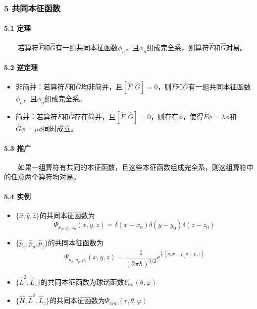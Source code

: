 \documentclass[UTF8,twocolumn]{ctexart}
\providecommand{\tightlist}{%
  \setlength{\itemsep}{0pt}\setlength{\parskip}{0pt}}
\let\oldparagraph\paragraph
\renewcommand{\paragraph}[1]{\oldparagraph{#1}\mbox{}}
\begin{document}
\hypertarget{ux5171ux540cux672cux5f81ux51fdux6570}{%
\subsubsection{5
共同本征函数}\label{ux5171ux540cux672cux5f81ux51fdux6570}}

\hypertarget{ux5b9aux7406}{%
\paragraph{ 5.1 定理}\label{ux5b9aux7406}}

  若算符\(\hat{F}\)和\(\hat{G}\)有一组共同本征函数\(\phi_n\)，且\({\phi_n}\)组成完全系，则算符\(\hat{F}\)和\(\hat{G}\)对易。

\hypertarget{ux9006ux5b9aux7406}{%
\paragraph{ 5.2 逆定理}\label{ux9006ux5b9aux7406}}

\begin{itemize}
\tightlist
\item
  非简并：若算符\(\hat{F}\)和\(\hat{G}\)均非简并，且\([\hat{F},\hat{G}]=0\)，则\(\hat{F}\)和\(\hat{G}\)有一组共同本征函数\(\phi_n\)，且\({\phi_n}\)组成完全系。
\item
  简并：若算符\(\hat{F}\)和\(\hat{G}\)存在简并，且\([\hat{F},\hat{G}]=0\)，则存在\(\phi\)，使得\(\hat{F}\phi=\lambda\phi\)和\(\hat{G}\phi=\mu\phi\)同时成立。
\end{itemize}

\hypertarget{ux63a8ux5e7f}{%
\paragraph{ 5.3 推广}\label{ux63a8ux5e7f}}

  如果一组算符有共同的本征函数，且这些本征函数组成完全系，则这组算符中的任意两个算符均对易。

\hypertarget{ux5b9eux4f8b}{%
\paragraph{ 5.4 实例}\label{ux5b9eux4f8b}}

\begin{itemize}
\tightlist
\item
  \(\{\hat{x},\hat{y},\hat{z}\}\)的共同本征函数为
  $$\Psi_{x_0,y_0,z_0}(x,y,z)=\delta(x-x_0)\delta(y-y_0)\delta(z-z_0)$$
\item
  \(\{\hat{p}_x,\hat{p}_y,\hat{p}_z\}\)的共同本征函数为
  $$\Psi_{p_x,p_y,p_z}(x,y,z)=\frac{1}{(2\pi\hbar)^{3/2}}e^{\frac{i}{\hbar}(p_xx+p_yy+p_zz)}$$
\item
  \(\{\hat{L}^2,\hat{L}_z\}\)的共同本征函数为球谐函数\(Y_{lm}(\theta,\varphi)\)
\item
  \(\{\hat{H},\hat{L}^2,\hat{L}_z\}\)的共同本征函数为\(\varPsi_{nlm}(r,\theta,\varphi)\)
\end{itemize}
\end{document}
